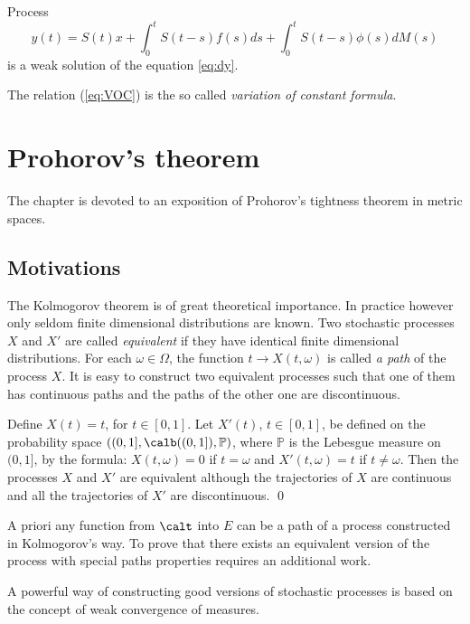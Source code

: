 \documentclass[preprint]{imsart}
\def\P{\mathbb P}
\begin{document}
{\begin{Proposition}
Process
\begin{equation}
\label{eq:VOC}
    y(t) = S(t)x + \int_0^t S(t-s)f(s) ds + \int_0^t S(t-s) \phi(s) dM(s)
\end{equation}
is a weak solution of the equation \ref{eq:dy}.
\end{Proposition}
The relation (\ref{eq:VOC})
is the so called  {\it variation of constant formula}.



\chapter{Prohorov's theorem}\label{capprohorov}
The chapter is devoted to an  exposition of  Prohorov's tightness theorem in metric spaces.

\section{Motivations}
The Kolmogorov theorem is of great theoretical
importance. In practice however only seldom finite
dimensional distributions are known. Two stochastic
processes $X$ and $X'$ are called {\em equivalent} if
they have identical finite dimensional distributions.
For each $\omega\in\Omega$, the function $t\to
X(t,\omega)$ is called {\em a path}
of the process $X$. It is
easy to construct two equivalent processes such that
one of them has continuous paths and the paths  of the
other one are discontinuous.

\begin{Example}\begin{em}
Define $X(t)=t$, for $t\in [0,1]$. Let $X'(t)$, $t\in
[0,1]$, be defined on the probability space
$((0,1],\calb((0,1]), \P )$, where $\P$ is the Lebesgue
measure on $(0,1]$, by the formula: $X(t,\omega)=0 $ if
$t=\omega$ and $X'(t,\omega)=t$ if $t\ne \omega$. Then
the processes $X$ and $X'$ are equivalent although the
trajectories of $X$ are continuous and all the
trajectories of $X'$ are discontinuous. \qed
\end{em}
\end{Example}


A priori any function from $\calt$ into $E$ can be a
path of a process constructed in Kolmogorov's way. To
prove that there exists an equivalent version of the
process with special paths properties requires an
additional work.


A powerful way of constructing good versions of
stochastic processes is based on the concept of weak
convergence of measures.


}
\end{document}
